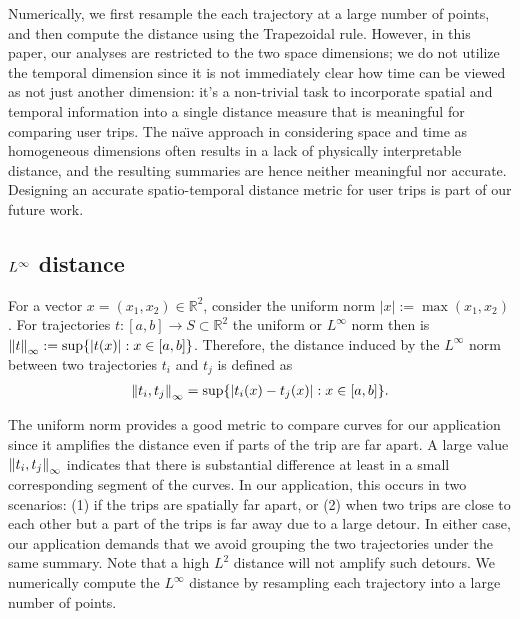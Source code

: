 Numerically, we first resample the each trajectory at a large number of points, and then compute the distance using the Trapezoidal rule. However, in this paper, our analyses are restricted to the two space dimensions; we do not utilize the temporal dimension since it is not immediately clear how time can be viewed as not just another dimension: it's a non-trivial task to incorporate spatial and temporal information into a single distance measure that is meaningful for comparing user trips. The na\"{\i}ve approach in considering space and time as homogeneous dimensions often results in a lack of physically interpretable distance, and the resulting summaries are hence neither meaningful nor accurate. Designing an accurate spatio-temporal distance metric for user trips is part of our future work.

\subsection{$L^\infty$ distance}
For a vector $x=(x_1,x_2) \in \mathbb{R}^2$, consider the uniform norm $|x|:=\max{(x_1,x_2)}$. For trajectories $t:[a,b]\rightarrow S \subset \mathbb{R}^2$ the uniform or $L^\infty $ norm then is $\left\lVert t\right\rVert_\infty:=\sup\{|t(x)|:x \in [a,b]\}$. Therefore, the distance induced by the $L^\infty$ norm between two trajectories $t_i$ and $t_j$ is defined as
\begin{align}
\left\lVert t_i,t_j\right\rVert_\infty = \sup\{|t_i(x)-t_j(x)|: x \in [a,b]\}.
\end{align}

The uniform norm provides a good metric to compare curves for our application since it amplifies the distance even if parts of the trip are far apart. A large value $\left\lVert t_i,t_j\right\rVert_\infty$ indicates that there is substantial difference at least in a small corresponding segment of the curves. In our application, this occurs in two scenarios: (1) if the trips are spatially far apart, or (2) when two trips are close to each other but a part of the trips is far away due to a large detour. In either case, our application demands that we avoid grouping the two trajectories under the same summary. Note that a high $L^2$ distance will not amplify such detours. We numerically compute the $L^\infty$ distance by resampling each trajectory into a large number of points.


